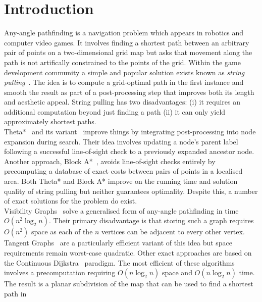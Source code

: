 \section{Introduction}
Any-angle pathfinding is a navigation problem which appears in robotics
and computer video games. It involves finding a shortest path between an 
arbitrary pair of points on a two-dimensional grid map but asks that 
movement along the path is not artifically constrained to the points of 
the grid.  Within the game development community a simple and popular 
solution exists known as \emph{string pulling}~\cite{pinter01,botea04}.
The idea is to compute a grid-optimal path in the first
instance and smooth the result as part of a post-processing step that improves
both its length and aesthetic appeal. String pulling has two disadvantages: 
(i) it requires an additional computation beyond just finding a path (ii)
it can only yield approximately shortest paths.
\\
Theta*~\cite{nash07} and its variant~\cite{%
nash10} improve things 
by integrating post-processing into node expansion during search. Their 
idea involves updating a node's parent label following a successful line-of-sight
check to a previously expanded ancestor node.
Another approach, Block A*~\cite{yap11}, avoids line-of-sight checks entirely 
by precomputing a database of exact costs between pairs of points in a localised area.
Both Theta* and Block A* improve on the running time and 
solution quality of string pulling but neither guarantees optimality.
Despite this, a number of exact solutions for the problem do exist.
\\
Visibility Graphs~\cite{lozanoperez79} solve a generalised form of 
any-angle pathfinding in time $O(n^2\log_{2}n)$. Their primary disadvantage
is that storing such a graph requires $O(n^2)$ space as each of the $n$ 
vertices can be adjacent to every other vertex.  
Tangent Graphs~\cite{liu92} are a particularly efficient 
variant of this idea but space requirements remain worst-case quadratic. 
Other exact approaches are based on the 
Continuous Dijkstra~\cite{mitchell87} paradigm.
The most efficient of these algorithms~\cite{hershberger99} involves a
precomputation requiring $O(n \log_{2}{n})$ space and $O(n\log_{2}n)$ time.  The result 
is a planar subdivision of the map that can be used to find a shortest path in 
